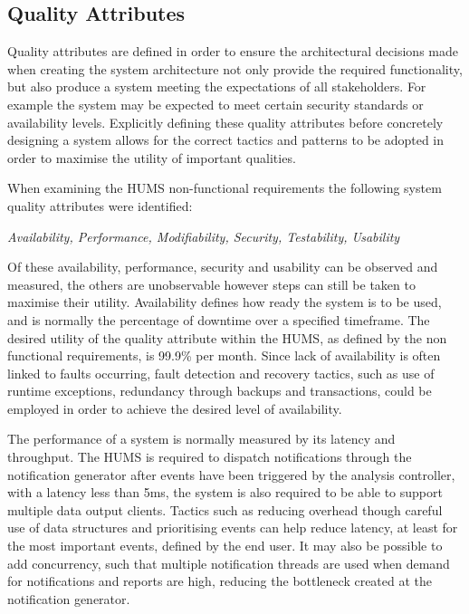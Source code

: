 \documentclass[10pt,a4paper]{article}
\begin{document}
\subsection{Quality Attributes}
Quality attributes are defined in order to ensure the architectural decisions made when creating the system architecture not only provide the required functionality, but also produce a system meeting the expectations of all stakeholders. For example the system may be expected to meet certain security standards or availability levels. Explicitly defining these quality attributes before concretely designing a system allows for the correct tactics and patterns to be adopted in order to maximise the utility of important 
qualities.

When examining the HUMS non-functional requirements the following system quality attributes were identified:
	\begin{center}
	\textit{
		Availability, Performance, Modifiability, Security, Testability, Usability}
	\end{center}
Of these availability, performance, security and usability can be observed and measured, the others are unobservable however steps can still be taken to maximise their utility.
Availability defines how ready the system is to be used, and is normally the percentage of downtime over a specified timeframe. The desired utility of the quality attribute within the HUMS, as defined by the non functional requirements, is  99.9\% per month. Since lack of availability is often linked to faults occurring, fault detection and recovery tactics, such as use of runtime exceptions, redundancy through backups and transactions, could be employed in order to achieve the desired level of availability. 

The performance of a system is normally measured by its latency and throughput. The HUMS is required to dispatch notifications through the notification generator after events have been triggered by the analysis controller, with a latency less than 5ms, the system is 
also required to be able to support multiple data output clients. Tactics such as reducing overhead though careful use of data structures and prioritising events can help reduce latency, at least for the most important events, defined by the end user. It may also be possible to add concurrency, such that multiple notification threads are used when demand for notifications and reports are high, reducing the bottleneck created at the notification generator.
\end{document}
